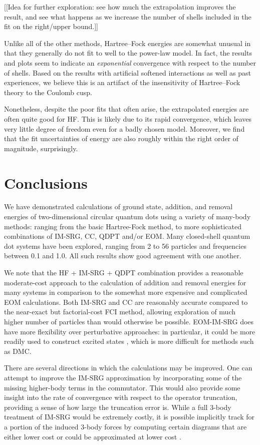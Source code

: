 [[Idea for further exploration: see how much the extrapolation improves the result, and see what happens as we increase the number of shells included in the fit on the right/upper bound.]]

Unlike all of the other methods, Hartree--Fock energies are somewhat unusual in that they generally do not fit to well to the power-law model.  In fact, the results and plots seem to indicate an \emph{exponential} convergence with respect to the number of shells.  Based on the results with artificial softened interactions as well as past experiences, we believe this is an artifact of the insensitivity of Hartree--Fock theory to the Coulomb cusp.

Nonetheless, despite the poor fits that often arise, the extrapolated energies are often quite good for HF.  This is likely due to its rapid convergence, which leaves very little degree of freedom even for a badly chosen model.  Moreover, we find that the fit uncertainties of energy are also roughly within the right order of magnitude, surprisingly.

\section{Conclusions}
\label{sec:conclusions}

We have demonstrated calculations of ground state, addition, and removal energies of two-dimensional circular quantum dots using a variety of many-body methods: ranging from the basic Hartree-Fock method, to more sophisticated combinations of IM-SRG, CC, QDPT and/or EOM.  Many closed-shell quantum dot systems have been explored, ranging from 2 to 56 particles and frequencies between 0.1 and 1.0.  All such results show good agreement with one another.

We note that the HF + IM-SRG + QDPT combination provides a reasonable moderate-cost approach to the calculation of addition and removal energies for many systems in comparison to the somewhat more expensive and complicated EOM calculations.  Both IM-SRG and CC are reasonably accurate compared to the near-exact but factorial-cost FCI method, allowing exploration of much higher number of particles than would otherwise be possible.  EOM-IM-SRG does have more flexibility over perturbative approaches: in particular, it could be more readily used to construct excited states \cite{2016arXiv161100661P}, which is more difficult for methods such as DMC.

There are several directions in which the calculations may be improved.  One can attempt to improve the IM-SRG approximation by incorporating some of the missing higher-body terms in the commutator.  This would also provide some insight into the rate of convergence with respect to the operator truncation, providing a sense of how large the truncation error is.  While a full 3-body treatment of IM-SRG would be extremely costly, it is possible implicitly track for a portion of the induced 3-body forces by computing certain diagrams that are either lower cost or could be approximated at lower cost \cite{IMSRG}.

